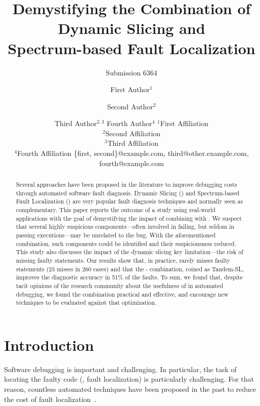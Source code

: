\documentclass{article}
\title{Demystifying the Combination of Dynamic Slicing and \\ Spectrum-based Fault
Localization}
\author{
    Submission 6364
}
\author{
First Author$^1$
\and
Second Author$^2$\and
Third Author$^{2,3}$\And
Fourth Author$^4$
\affiliations
$^1$First Affiliation\\
$^2$Second Affiliation\\
$^3$Third Affiliation\\
$^4$Fourth Affiliation
\emails
\{first, second\}@example.com,
third@other.example.com,
fourth@example.com
}
\begin{document}
\maketitle

\begin{abstract}
Several approaches have been proposed in the literature to improve debugging
costs through automated software fault diagnosis.  Dynamic Slicing (\ds{}) and
Spectrum-based Fault Localization (\sfl{}) are very popular fault diagnosis
techniques and normally seen as complementary.  This paper reports the outcome
of a study using real-world applications with the goal of demystifying the
impact of combining \ds{} with \sfl{}.  We suspect that several highly
suspicious components---often involved in failing, but seldom in passing
executions---may be unrelated to the bug. With the aforementioned combination,
such components could be identified and their suspiciousness reduced.  This
study also discusses the impact of the dynamic slicing key limitation---the risk
of missing faulty statements. Our results show that, in practice, \ds{} rarely
misses faulty statements (23 misses in 260 cases) and that the
\ds{}-\sfl{} combination, coined as Tandem-SL, improves the diagnostic accuracy
in 51\% of the faults. To sum, we found that, despite tacit opinions of the
research community about the usefulness of \ds{} in automated debugging, we
found the combination practical and effective, and encourage new \sfl{}
techniques to be evaluated against that optimization.
\end{abstract}


\section{Introduction}

Software debugging is important and challenging. In particular, the task of
locating the faulty code (\ie{}, fault localization) is particularly
challenging. For that reason, countless automated techniques have been proposed
in the past to reduce the cost of fault localization~\cite{7390282}.
\end{document}
